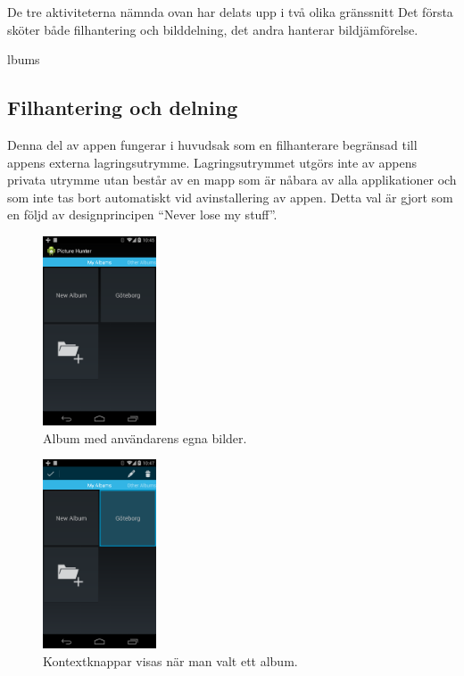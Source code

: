 \documentclass[11px, a4paper, twocolumn]{article}
\begin{document}
	De tre aktiviteterna nämnda ovan har delats upp i två olika gränssnitt Det första sköter både filhantering och bilddelning, det andra hanterar bildjämförelse.

lbums
\subsection{Filhantering och delning}

	Denna del av appen fungerar i huvudsak som en filhanterare begränsad till appens externa lagringsutrymme. Lagringsutrymmet utgörs inte av appens privata utrymme utan består av en mapp som är nåbara av alla applikationer och som inte tas bort automatiskt vid avinstallering av appen. Detta val är gjort som en följd av designprincipen ``Never lose my stuff''\cite{Principles}.

	\begin{figure}[p]
		\centering
	    \includegraphics[width=0.3\textwidth]{img/albums}
		\caption{\label{fig:albums} Album med användarens egna bilder.}
	\end{figure}

	\begin{figure}[p]
		\centering
	    \includegraphics[width=0.3\textwidth]{img/albums_selection}
		\caption{\label{fig:albums_selection}Kontextknappar visas när man valt ett album.}
	\end{figure}
\end{document}
